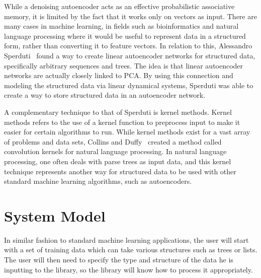 \documentclass{sig-alternate}
\begin{document}
While a denoising autoencoder acts as an effective probabilistic associative memory, it is
limited by the fact that it works only on vectors as input. There are many cases in machine
learning, in fields such as bioinformatics and natural language processing where it would be 
useful to represent data in a structured form, rather
than converting it to feature vectors. In relation to this, Alessandro Sperduti~\cite{sperduti}
found a way to create linear autoencoder networks for structured data, specifically
arbitrary sequences and trees. The idea is that linear autoencoder networks are actually
closely linked to PCA. By using this connection and modeling the structured data via
linear dynamical systems, Sperduti was able to create a way to store structured data
in an autoencoder network.

A complementary technique to that of Sperduti is kernel methods. Kernel methods refers to the
use of a kernel function to preprocess input to make it easier for certain algorithms to run. 
While kernel methods exist for a vast array of problems and data sets, Collins and Duffy~\cite{kernels}
created a method called convolution kernels for natural language processing. In natural
language processing, one often deals with parse trees as input data, and this kernel technique
represents another way for structured data to be used with other standard machine learning
algorithms, such as autoencoders.

\section{System Model}
\label{sec:sysmodel}

In similar fashion to standard machine learning applications, the user 
will start with a set of training data which can take various structures such as trees or lists. The 
user will then need to specify the type and structure of the data he is inputting to the library, so 
the library will know how to process it appropriately. 

\end{document}
